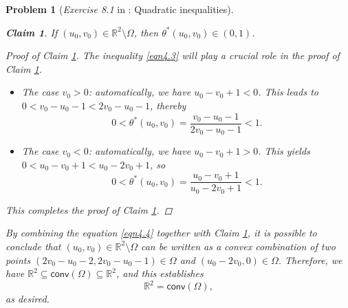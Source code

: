 \documentclass[11pt]{article}
\newtheorem{claim}{\sf Claim}
\newtheorem{problem}{Problem}
\numberwithin{equation}{problem}
\begin{document}
\begin{problem} [\emph{Exercise 8.1} in \cite{calafiore2014optimization}: Quadratic inequalities]
{\begin{claim}
\label{claim1}
If $\left( u_0, v_0 \right) \in \mathbb{R}^2 \setminus \Omega$, then $\theta^* \left( u_0, v_0 \right) \in \left( 0, 1 \right)$.
\end{claim}

\begin{proof} [Proof of Claim \ref{claim1}]
The inequality \eqref{eqn4.3} will play a crucial role in the proof of Claim \ref{claim1}.
\begin{itemize}
    \item The case $v_0 > 0$: automatically, we have $u_0 - v_0 + 1 < 0$. This leads to $0 < v_0 - u_0 - 1 < 2 v_0 - u_0 - 1$, thereby
    \begin{equation*}
        0 < \theta^* \left( u_0, v_0 \right) = \frac{v_0 - u_0 - 1}{2 v_0 - u_0 - 1} < 1.
    \end{equation*}
    \item The case $v_0 < 0$: automatically, we have $u_0 - v_0 + 1 > 0$. This yields $0 < u_0 - v_0 + 1 < u_0 - 2v_0 + 1$, so
    \begin{equation*}
        0 < \theta^* \left( u_0, v_0 \right) = \frac{u_0 - v_0 + 1}{u_0 - 2 v_0 + 1} < 1.
    \end{equation*}
\end{itemize}
This completes the proof of Claim \ref{claim1}.

\end{proof}

\indent By combining the equation \eqref{eqn4.4} together with Claim \ref{claim1}, it is possible to conclude that $\left( u_0, v_0 \right) \in \mathbb{R}^2 \setminus \Omega$ can be written as a convex combination of two points $\left( 2v_0 - u_0 - 2, 2v_0 - u_0 - 1 \right) \in \Omega$ and $\left( u_0 - 2v_0, 0 \right) \in \Omega$. Therefore, we have $\mathbb{R}^2 \subseteq \textsf{conv}(\Omega) \subseteq \mathbb{R}^2$, and this establishes
\begin{equation*}
    \mathbb{R}^2 = \textsf{conv}(\Omega),
\end{equation*}
as desired.
}
\end{problem}

\newpage



\end{document}
